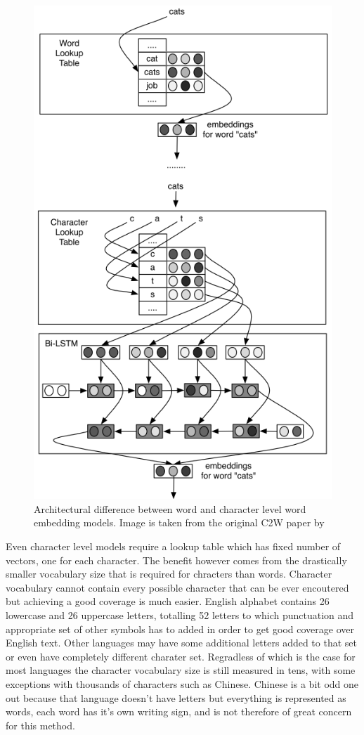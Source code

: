 \documentclass[12pt,a4paper,english
]{tutthesis}
\begin{document}
\begin{figure}[htbp]
\caption{Architectural difference between word and character level word embedding models. Image is taken from the original C2W paper by \cite{Ling2015}}
\label{figure:c2w}
\centering
\includegraphics[width=12cm]{c2w.png}
\end{figure}

Even character level models require a lookup table which has fixed number of vectors, one for each character. The benefit however comes from the drastically smaller vocabulary size that is required for chracters than words. Character vocabulary cannot contain every possible character that can be ever encoutered but achieving a good coverage is much easier. English alphabet contains 26 lowercase and 26 uppercase letters, totalling 52 letters to which punctuation and appropriate set of other symbols has to added in order to get good coverage over English text. Other languages may have some additional letters added to that set or even have completely different charater set. Regradless of which is the case for most languages the character vocabulary size is still measured in tens, with some exceptions with thousands of characters such as Chinese. Chinese is a bit odd one out because that language doesn't have letters but everything is represented as words, each word has it's own writing sign, and is not therefore of great concern for this method.
\end{document}
